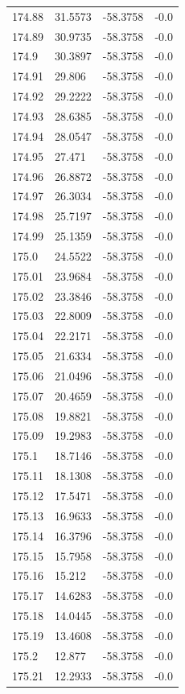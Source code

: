 \begin{table}[H]
\begin{tabular}{llll}
174.88 & 31.5573 & -58.3758 & -0.0 \\
174.89 & 30.9735 & -58.3758 & -0.0 \\
174.9 & 30.3897 & -58.3758 & -0.0 \\
174.91 & 29.806 & -58.3758 & -0.0 \\
174.92 & 29.2222 & -58.3758 & -0.0 \\
174.93 & 28.6385 & -58.3758 & -0.0 \\
174.94 & 28.0547 & -58.3758 & -0.0 \\
174.95 & 27.471 & -58.3758 & -0.0 \\
174.96 & 26.8872 & -58.3758 & -0.0 \\
174.97 & 26.3034 & -58.3758 & -0.0 \\
174.98 & 25.7197 & -58.3758 & -0.0 \\
174.99 & 25.1359 & -58.3758 & -0.0 \\
175.0 & 24.5522 & -58.3758 & -0.0 \\
175.01 & 23.9684 & -58.3758 & -0.0 \\
175.02 & 23.3846 & -58.3758 & -0.0 \\
175.03 & 22.8009 & -58.3758 & -0.0 \\
175.04 & 22.2171 & -58.3758 & -0.0 \\
175.05 & 21.6334 & -58.3758 & -0.0 \\
175.06 & 21.0496 & -58.3758 & -0.0 \\
175.07 & 20.4659 & -58.3758 & -0.0 \\
175.08 & 19.8821 & -58.3758 & -0.0 \\
175.09 & 19.2983 & -58.3758 & -0.0 \\
175.1 & 18.7146 & -58.3758 & -0.0 \\
175.11 & 18.1308 & -58.3758 & -0.0 \\
175.12 & 17.5471 & -58.3758 & -0.0 \\
175.13 & 16.9633 & -58.3758 & -0.0 \\
175.14 & 16.3796 & -58.3758 & -0.0 \\
175.15 & 15.7958 & -58.3758 & -0.0 \\
175.16 & 15.212 & -58.3758 & -0.0 \\
175.17 & 14.6283 & -58.3758 & -0.0 \\
175.18 & 14.0445 & -58.3758 & -0.0 \\
175.19 & 13.4608 & -58.3758 & -0.0 \\
175.2 & 12.877 & -58.3758 & -0.0 \\
175.21 & 12.2933 & -58.3758 & -0.0 \\

\end{tabular}
\end{table}
